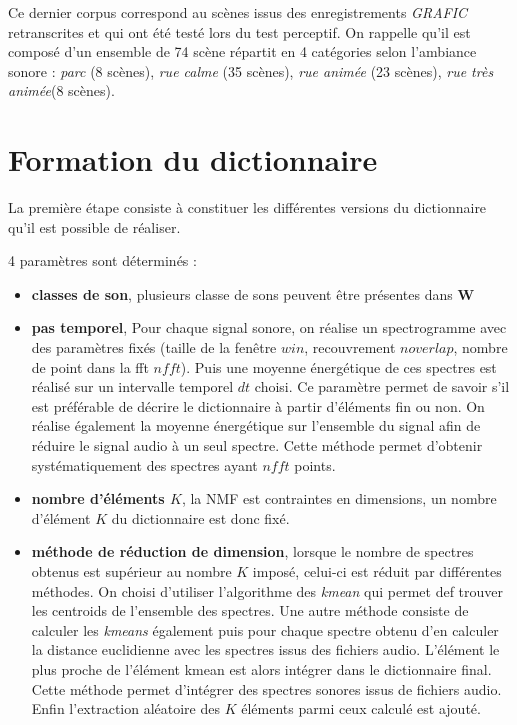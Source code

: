 Ce dernier corpus correspond au scènes issus des enregistrements \textit{GRAFIC} retranscrites et qui ont été testé lors du test perceptif. On rappelle qu'il est composé d'un ensemble de 74 scène répartit en 4 catégories selon l'ambiance sonore : \textit{parc} (8 scènes), \textit{rue calme} (35 scènes), \textit{rue animée} (23 scènes), \textit{rue très animée}(8 scènes). 

\section{Formation du dictionnaire}
La première étape consiste à constituer les différentes versions du dictionnaire qu'il est possible de réaliser. 

4 paramètres sont déterminés : 
\begin{itemize}
\item \textbf{classes de son}, plusieurs classe de sons peuvent être présentes dans $\mathbf{W}$
\item \textbf{pas temporel}, Pour chaque signal sonore, on réalise un spectrogramme avec des paramètres fixés (taille de la fenêtre $win$, recouvrement $noverlap$, nombre de point dans la fft $nfft$). Puis une moyenne énergétique de ces spectres est réalisé sur un intervalle temporel $dt$ choisi. Ce paramètre permet de savoir s'il est préférable de décrire le dictionnaire à partir d'éléments fin ou non. On réalise également la moyenne énergétique sur l'ensemble du signal afin de réduire le signal audio à un seul spectre. Cette méthode permet d'obtenir systématiquement des spectres ayant $nfft$ points. 
\item \textbf{nombre d'éléments $K$}, la NMF est contraintes en dimensions, un nombre d'élément $K$ du dictionnaire est donc fixé.
\item \textbf{méthode de réduction de dimension}, lorsque le nombre de spectres obtenus est supérieur au nombre $K$ imposé, celui-ci est réduit par différentes méthodes. On choisi d'utiliser l'algorithme des \textit{kmean} qui permet def trouver les centroids de l'ensemble des spectres. Une autre méthode consiste de calculer les \textit{kmeans} également puis pour chaque spectre obtenu d'en calculer la distance euclidienne avec les spectres issus des fichiers audio. L'élément le plus proche de l'élément kmean est alors intégrer dans le dictionnaire final. Cette méthode permet d'intégrer des spectres sonores issus de fichiers audio. Enfin l'extraction aléatoire des $K$ éléments parmi ceux calculé est ajouté. 
\end{itemize}

